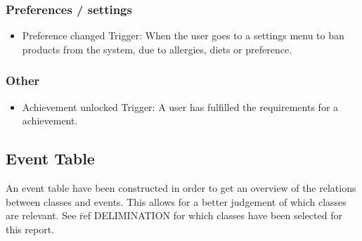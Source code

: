 \subsubsection{Preferences / settings}
\begin{itemize}
\item Preference changed
    \subitem Trigger: When the user goes to a settings menu to ban products from the system, due to allergies, diets or preference.
\end{itemize}


\subsubsection{Other}
\begin{itemize}
\item Achievement unlocked
    \subitem Trigger: A user has fulfilled the requirements for a achievement.
\end{itemize}

\subsection{Event Table}
An event table have been constructed in order to get an overview of the relations between classes and events. This allows for a better judgement of which classes are relevant. See \.ref DELIMINATION for which classes have been selected for this report.


